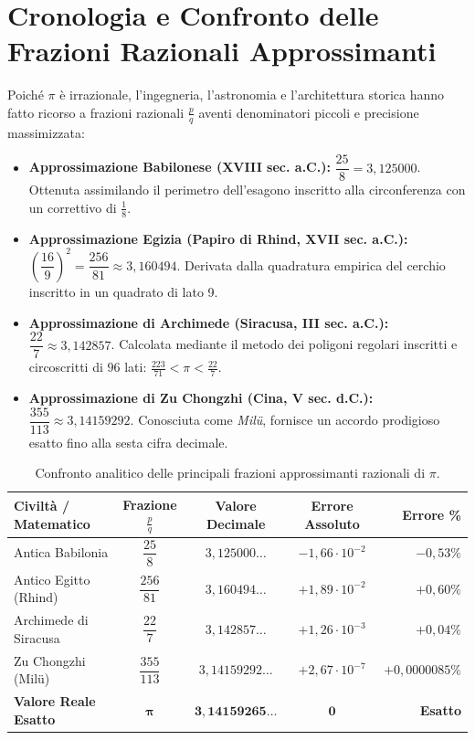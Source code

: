 \documentclass[11pt,a4paper,oneside]{report}
\begin{document}
\section{Cronologia e Confronto delle Frazioni Razionali Approssimanti}
\begin{metodo}
Poich\'e $\pi$ \`e irrazionale, l'ingegneria, l'astronomia e l'architettura storica hanno fatto ricorso a frazioni razionali $\frac{p}{q}$ aventi denominatori piccoli e precisione massimizzata:
\begin{itemize}[leftmargin=2em]
  \item \textbf{Approssimazione Babilonese (XVIII sec. a.C.):} $\dfrac{25}{8} = 3{,}125000$. Ottenuta assimilando il perimetro dell'esagono inscritto alla circonferenza con un correttivo di $\frac{1}{8}$.
  \item \textbf{Approssimazione Egizia (Papiro di Rhind, XVII sec. a.C.):} $\left(\dfrac{16}{9}\right)^2 = \dfrac{256}{81} \approx 3{,}160494$. Derivata dalla quadratura empirica del cerchio inscritto in un quadrato di lato 9.
  \item \textbf{Approssimazione di Archimede (Siracusa, III sec. a.C.):} $\dfrac{22}{7} \approx 3{,}142857$. Calcolata mediante il metodo dei poligoni regolari inscritti e circoscritti di $96$ lati: $\frac{223}{71} < \pi < \frac{22}{7}$.
  \item \textbf{Approssimazione di Zu Chongzhi (Cina, V sec. d.C.):} $\dfrac{355}{113} \approx 3{,}14159292$. Conosciuta come \textit{Mil\"u}, fornisce un accordo prodigioso esatto fino alla sesta cifra decimale.
\end{itemize}
\end{metodo}

\begin{table}[H]
\centering
\small
\renewcommand{\arraystretch}{1.25}
\begin{tabularx}{\textwidth}{>{\raggedright\arraybackslash}X c c c r}
\toprule
\textbf{Civilt\`a / Matematico} & \textbf{Frazione $\frac{p}{q}$} & \textbf{Valore Decimale} & \textbf{Errore Assoluto} & \textbf{Errore \%} \\
\midrule
Antica Babilonia & $\dfrac{25}{8}$ & $3{,}125000\dots$ & $-1{,}66 \cdot 10^{-2}$ & $-0{,}53\%$ \\
\addlinespace
Antico Egitto (Rhind) & $\dfrac{256}{81}$ & $3{,}160494\dots$ & $+1{,}89 \cdot 10^{-2}$ & $+0{,}60\%$ \\
\addlinespace
Archimede di Siracusa & $\dfrac{22}{7}$ & $3{,}142857\dots$ & $+1{,}26 \cdot 10^{-3}$ & $+0{,}04\%$ \\
\addlinespace
Zu Chongzhi (Mil\"u) & $\dfrac{355}{113}$ & $3{,}14159292\dots$ & $+2{,}67 \cdot 10^{-7}$ & $+0{,}0000085\%$ \\
\addlinespace
\midrule
\textbf{Valore Reale Esatto} & $\bm{\pi}$ & $\mathbf{3{,}14159265\dots}$ & $\mathbf{0}$ & \textbf{Esatto} \\
\bottomrule
\end{tabularx}
\caption{Confronto analitico delle principali frazioni approssimanti razionali di $\pi$.}
\end{table}
\end{document}
